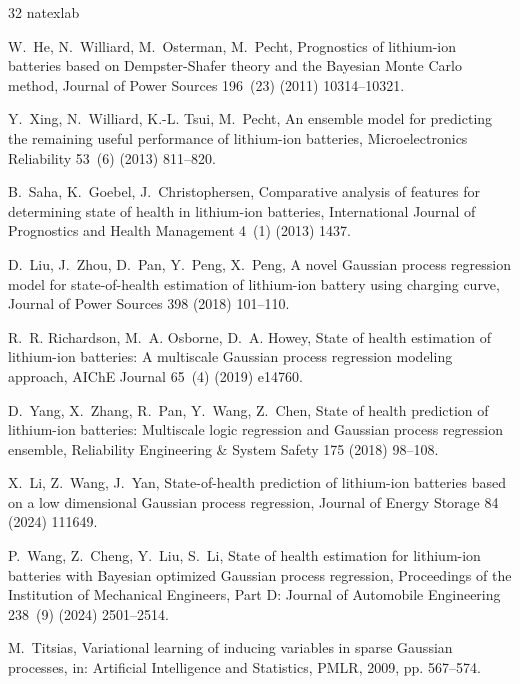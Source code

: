 \documentclass[a4paper,fleqn]{cas-sc}
\begin{document}
\begin{thebibliography}{32}
\expandafter\ifx\csname natexlab\endcsname\relax\def\natexlab#1{#1}\fi
\providecommand{\url}[1]{\texttt{#1}}
\providecommand{\href}[2]{#2}

W.~He, N.~Williard, M.~Osterman, M.~Pecht, Prognostics of lithium-ion batteries based on Dempster-Shafer theory and the Bayesian Monte Carlo method, Journal of Power Sources 196~(23) (2011) 10314--10321.

Y.~Xing, N.~Williard, K.-L. Tsui, M.~Pecht, An ensemble model for predicting the remaining useful performance of lithium-ion batteries, Microelectronics Reliability 53~(6) (2013) 811--820.

B.~Saha, K.~Goebel, J.~Christophersen, Comparative analysis of features for determining state of health in lithium-ion batteries, International Journal of Prognostics and Health Management 4~(1) (2013) 1437.

D.~Liu, J.~Zhou, D.~Pan, Y.~Peng, X.~Peng, A novel Gaussian process regression model for state-of-health estimation of lithium-ion battery using charging curve, Journal of Power Sources 398 (2018) 101--110.

R.~R. Richardson, M.~A. Osborne, D.~A. Howey, State of health estimation of lithium-ion batteries: A multiscale Gaussian process regression modeling approach, AIChE Journal 65~(4) (2019) e14760.

D.~Yang, X.~Zhang, R.~Pan, Y.~Wang, Z.~Chen, State of health prediction of lithium-ion batteries: Multiscale logic regression and Gaussian process regression ensemble, Reliability Engineering \& System Safety 175 (2018) 98--108.

X.~Li, Z.~Wang, J.~Yan, State-of-health prediction of lithium-ion batteries based on a low dimensional Gaussian process regression, Journal of Energy Storage 84 (2024) 111649.

P.~Wang, Z.~Cheng, Y.~Liu, S.~Li, State of health estimation for lithium-ion batteries with Bayesian optimized Gaussian process regression, Proceedings of the Institution of Mechanical Engineers, Part D: Journal of Automobile Engineering 238~(9) (2024) 2501--2514.

M.~Titsias, Variational learning of inducing variables in sparse Gaussian processes, in: Artificial Intelligence and Statistics, PMLR, 2009, pp. 567--574.


\end{thebibliography}
\end{document}
